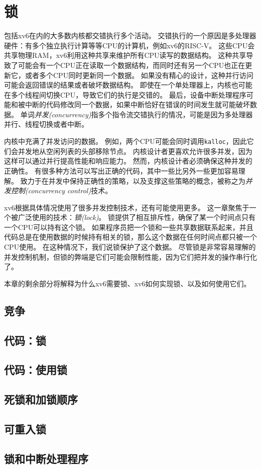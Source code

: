 \chapter{锁}\label{ch06}

包括xv6在内的大多数内核都交错执行多个活动。
交错执行的一个原因是多处理器硬件：有多个独立执行计算等等CPU的计算机，例如xv6的RISC-V。
这些CPU会共享物理RAM，xv6利用这种共享来维护所有CPU读写的数据结构。
这种共享导致了可能会有一个CPU正在读取一个数据结构，而同时还有另一个CPU也正在更新它，或者多个CPU同时更新同一个数据。
如果没有精心的设计，这种并行访问可能会返回错误的结果或者破坏数据结构。
即使在一个单处理器上，内核也可能在多个线程间切换CPU，导致它们的执行是交错的。
最后，设备中断处理程序可能和被中断的代码修改同一个数据，如果中断恰好在错误的时间发生就可能破坏数据。
单词\emph{并发(concurrency)}指多个指令流交错执行的情况，可能是因为多处理器并行、线程切换或者中断。

内核中充满了并发访问的数据。
例如，两个CPU可能会同时调用\texttt{kalloc}，因此它们会并发地从空闲列表的头部移除节点。
内核设计者更喜欢允许很多并发，因为这样可以通过并行提高性能和响应能力。
然而，内核设计者必须确保这种并发的正确性。
有很多种方法可以写出正确的代码，其中一些比另外一些更加容易理解。
致力于在并发中保持正确性的策略，以及支撑这些策略的概念，被称之为\emph{并发控制(concurrency control)}技术。

xv6根据具体情况使用了很多并发控制技术，还有可能使用更多。
这一章聚焦于一个被广泛使用的技术：\emph{锁(lock)}。
锁提供了相互排斥性，确保了某一个时间点只有一个CPU可以持有这个锁。
如果程序员把一个锁和一些共享数据联系起来，并且代码总是在使用数据的时候持有相关的锁，那么这个数据在任何时间点都只被一个CPU使用。
在这种情况下，我们说锁保护了这个数据。
尽管锁是非常容易理解的并发控制机制，但锁的弊端是它们可能会限制性能，因为它们把并发的操作串行化了。

本章的剩余部分将解释为什么xv6需要锁、xv6如何实现锁、以及如何使用它们。

\section{竞争}

\section{代码：锁}

\section{代码：使用锁}

\section{死锁和加锁顺序}

\section{可重入锁}

\section{锁和中断处理程序}\label{s6-6}
